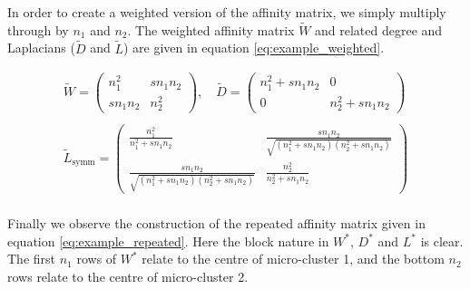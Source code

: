 In order to create a weighted version of the affinity matrix, we simply multiply through by $n_1$ and $n_2$. The weighted affinity matrix $\tilde{W}$ and related degree and Laplacians ($\tilde{D}$ and $\tilde{L}$) are given in equation \eqref{eq:example_weighted}.%

\begin{equation}
\begin{gathered}
 \tilde{W} = \left(
  \begin{array}{cc}
    n_1^2 & sn_1n_2 \\
    sn_1n_2 & n_2^2
  \end{array} \right) , \quad 
%
 \tilde{D} = \left(
  \begin{array}{cc}
    n_1^2 + sn_1n_2 & 0 \\
    0 & n_2^2 + sn_1n_2
  \end{array} \right) \\ \\ 
 \tilde{L}_{\text{symm}} = \left(
  \begin{array}{cc}
   \frac{n_1^2}{n_1^2+sn_1n_2} & \frac{sn_1n_2}{\sqrt{(n_1^2+sn_1n_2)(n_2^2+sn_1n_2)}} \\
   \frac{sn_1n_2}{\sqrt{(n_1^2+sn_1n_2)(n_2^2+sn_1n_2)}} &  \frac{n_2^2}{n_2^2+sn_1n_2}
  \end{array} \right) \\
\end{gathered} \label{eq:example_weighted} 
\end{equation}

Finally we observe the construction of the repeated affinity matrix given in equation \eqref{eq:example_repeated}. Here the block nature in $W^*$, $D^*$ and $L^*$ is clear. The first $n_1$ rows of $W^*$ relate to the centre of micro-cluster 1, and the bottom $n_2$ rows relate to the centre of micro-cluster 2.

